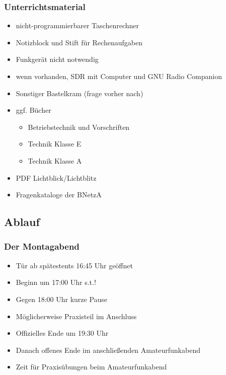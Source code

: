 \begin{frame}
  \frametitle{Unterrichtsmaterial}

  \begin{itemize}
    \item nicht-programmierbarer Taschenrechner
    \item Notizblock und Stift für Rechenaufgaben
    \item Funkgerät nicht notwendig
    \item wenn vorhanden, SDR mit Computer und GNU Radio Companion
    \item Sonstiger Bastelkram (frage vorher nach)
    \item ggf. Bücher
      \begin{itemize}
        \item Betriebstechnik und Vorschriften \hyperlink{refs}{\cite{bv}}
        \item Technik Klasse E \hyperlink{refs}{\cite{ale}}
        \item Technik Klasse A \hyperlink{refs}{\cite{ala}}
      \end{itemize}
    \item PDF Lichtblick/Lichtblitz \hyperlink{refs}{\cite{lb}}
    \item Fragenkataloge der BNetzA
  \end{itemize}
\end{frame}


\subsection{Ablauf}

\begin{frame}
  \frametitle{Der Montagabend}

  \begin{itemize}
    \item Tür ab spätestents 16:45 Uhr geöffnet
    \item Beginn um 17:00 Uhr s.t.!
    \item Gegen 18:00 Uhr kurze Pause
    \item Möglicherweise Praxisteil im Anschluss
    \item Offizielles Ende um 19:30 Uhr
    \item Danach offenes Ende im anschließenden Amateurfunkabend
    \item Zeit für Praxisübungen beim Amateurfunkabend
  \end{itemize}
\end{frame}

